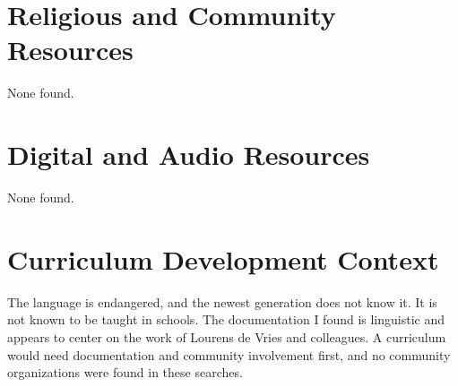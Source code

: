 \documentclass[12pt]{article}
\begin{document}
\section{Religious and Community Resources}
None found.

\section{Digital and Audio Resources}
None found.

\section{Curriculum Development Context}
The language is endangered, and the newest generation does not know it. It is not known to be taught in schools. The documentation I found is linguistic and appears to center on the work of Lourens de Vries and colleagues. A curriculum would need documentation and community involvement first, and no community organizations were found in these searches.
\end{document}
